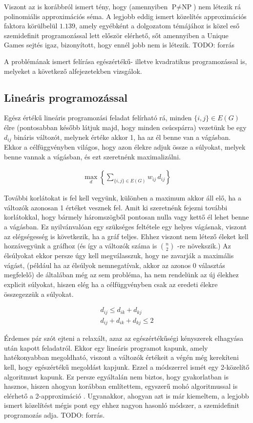 Viszont az is korábbról ismert tény, hogy (amennyiben $\text{P} \neq \text{NP}$) nem létezik rá polinomiális approximációs séma. A legjobb eddig ismert közelítés approximációs faktora körülbelül $1.139$, amely egyébként a dolgozatom témájához is közel eső szemidefinit programozással lett először elérhető, sőt amennyiben a Unique Games sejtés igaz, bizonyított, hogy ennél jobb nem is létezik. TODO: forrás

A problémának ismert felírása egészértékű- illetve kvadratikus programozással is, melyeket a következő alfejezetekben vizsgálok.

\subsection{Lineáris programozással}

Egész értékű lineáris programozási feladat felírható rá, minden $\{i,j\} \in E(G)$ élre (pontosabban később látjuk majd, hogy minden csúcspárra) vezetünk be egy $d_{ij}$ bináris változót, melynek értéke akkor 1, ha az él benne van a vágásban. Ekkor a célfüggvényben világos, hogy azon élekre adjuk össze a súlyokat, melyek benne vannak a vágásban, és ezt szeretnénk maximalizálni.

\begin{align}
	\max_{d} \left\{ \sum_{\{i,j\}\in E(G)}{w_{ij} \, d_{ij}}\right\}
\end{align}

További korlátokat is fel kell vegyünk, különben a maximum akkor áll elő, ha a változók azonosan 1 értéket vesznek fel.
Amit ki szeretnénk fejezni további korlátokkal, hogy bármely háromszögből pontosan nulla vagy kettő él lehet benne a vágásban. Ez nyilvánvalóan egy szükséges feltétele egy helyes vágásnak, viszont az elégségesség is következik, ha a gráf teljes. Ehhez viszont nem létező éleket kell hozzávegyünk a gráfhoz (és így a változók száma is $\binom{n}{2}$ -re növekszik.) Az élsúlyokat ekkor persze úgy kell megválasszuk, hogy ne zavarják a maximális vágást, (például ha az élsúlyok nemnegatívak, akkor az azonos 0 választás megfelelő) de általában még az sem probléma, ha nem rendelünk az új élekhez explicit súlyokat, hiszen elég ha a célfüggvényben csak az eredeti élekre összegezzük a súlyokat.

\begin{align}
 d_{ij} \leq d_{ik}+d_{kj}  \\
 d_{ij}+d_{ik}+d_{kj} \leq 2  
\end{align}

Érdemes pár szót ejteni a relaxált, azaz az egészértékűségi kényszerek elhagyása után kapott feladatról. Ekkor egy lineáris programot kapunk, amely hatékonyabban megoldható, viszont a változók értékeit a végén még kerekíteni kell, hogy egészértékű megoldást kapjunk. Ezzel a módszerrel ismét egy 2-közelítő algoritmust kapunk. Ez persze egyáltalán nem biztos, hogy gyakorlatban is hasznos, hiszen ahogyan korábban említettem, egyszerű mohó algoritmussal is elérhető a 2-approximáció \cite{10.5555/1283383.1283390, POLJAK1994191}.
Ugyanakkor, ahogyan azt is már kiemeltem, a legjobb ismert közelítést mégis pont egy ehhez nagyon hasonló módszer, a szemidefinit programozás adja. TODO: forrás.


